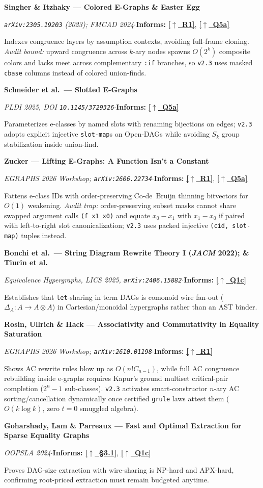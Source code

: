 \documentclass[12pt]{article}
\newcommand{\secback}[2]{\hyperref[#1]{\textcolor{linkblue}{\textbf{\small[\(\uparrow\)~#2]}}}}
\newcommand{\litentry}[4]{%
  \par\medskip\noindent\hypertarget{lit:#1}{}%
  \textbf{#2}\par\nopagebreak\noindent
  {\footnotesize\textit{#3}\quad$\cdot$\quad\textbf{Informs:} #4}\par\nopagebreak\smallskip\noindent\ignorespaces
}
\begin{document}
\litentry{singher2023}{Singher \& Itzhaky --- Colored E-Graphs \& Easter Egg}{\texttt{arXiv:2305.19203} (2023); FMCAD 2024}{\secback{sec:thesis}{R1}, \secback{ans:5a}{Q5a}}
Indexes congruence layers by assumption contexts, avoiding full-frame cloning. \emph{Audit bound:} upward congruence across $k$-ary nodes spawns $O(2^k)$ composite colors and lacks meet across complementary \texttt{:if} branches, so \texttt{v2.3} uses masked \texttt{cbase} columns instead of colored union-finds.

\litentry{schneider2025}{Schneider et al.\ --- Slotted E-Graphs}{PLDI 2025, DOI \texttt{10.1145/3729326}}{\secback{ans:5a}{Q5a}}
Parameterizes e-classes by named slots with renaming bijections on edges; \texttt{v2.3} adopts explicit injective \texttt{slot-map}s on Open-DAGs while avoiding $S_k$ group stabilization inside union-find.

\litentry{zucker2026}{Zucker --- Lifting E-Graphs: A Function Isn't a Constant}{EGRAPHS 2026 Workshop; \texttt{arXiv:2606.22734}}{\secback{sec:thesis}{R1}, \secback{ans:5a}{Q5a}}
Fattens e-class IDs with order-preserving Co-de~Bruijn thinning bitvectors for $O(1)$ weakening. \emph{Audit trap:} order-preserving subset masks cannot share swapped argument calls \texttt{(f x1 x0)} and equate $x_0 - x_1$ with $x_1 - x_0$ if paired with left-to-right slot canonicalization; \texttt{v2.3} uses packed injective \texttt{(cid, slot-map)} tuples instead.

\litentry{bonchi2022}{Bonchi et al.\ --- String Diagram Rewrite Theory I (\emph{JACM} 2022); \& \hypertarget{lit:tiurin2025}{}Tiurin et al.}{Equivalence Hypergraphs, LICS 2025, \texttt{arXiv:2406.15882}}{\secback{ans:1c}{Q1c}}
Establishes that \texttt{let}-sharing in term DAGs is comonoid wire fan-out ($\Delta_A : A \to A \otimes A$) in Cartesian/monoidal hypergraphs rather than an AST binder.

\litentry{rosin2026}{Rosin, Ullrich \& Hack --- Associativity and Commutativity in Equality Saturation}{EGRAPHS 2026 Workshop; \texttt{arXiv:2610.01198}}{\secback{sec:thesis}{R1}}
Shows AC rewrite rules blow up as $O(n! C_{n-1})$, while full AC congruence rebuilding inside e-graphs requires Kapur's ground multiset critical-pair completion ($2^n - 1$ sub-classes). \texttt{v2.3} activates smart-constructor $n$-ary AC sorting/cancellation dynamically once certified \texttt{grule} laws attest them ($O(k\log k)$, zero $t=0$ smuggled algebra).

\litentry{goharshady2024}{Goharshady, Lam \& Parreaux --- Fast and Optimal Extraction for Sparse Equality Graphs}{OOPSLA 2024}{\secback{sec:v2b-accounting}{\S3.1}, \secback{ans:1c}{Q1c}}
Proves DAG-size extraction with wire-sharing is NP-hard and APX-hard, confirming root-priced extraction must remain budgeted anytime.
\end{document}
